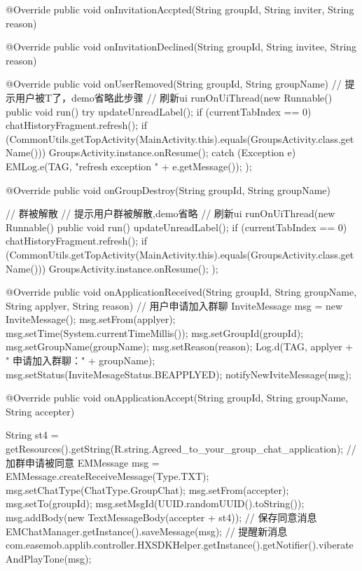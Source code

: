 {{{		}

		@Override
		public void onInvitationAccpted(String groupId, String inviter, String reason) {

		}

		@Override
		public void onInvitationDeclined(String groupId, String invitee, String reason) {

		}

		@Override
		public void onUserRemoved(String groupId, String groupName) {
			// 提示用户被T了，demo省略此步骤
			// 刷新ui
			runOnUiThread(new Runnable() {
				public void run() {
					try {
						updateUnreadLabel();
						if (currentTabIndex == 0)
							chatHistoryFragment.refresh();
						if (CommonUtils.getTopActivity(MainActivity.this).equals(GroupsActivity.class.getName())) {
							GroupsActivity.instance.onResume();
						}
					} catch (Exception e) {
						EMLog.e(TAG, "refresh exception " + e.getMessage());
					}
				}
			});
		}

		@Override
		public void onGroupDestroy(String groupId, String groupName) {
			// 群被解散
			// 提示用户群被解散,demo省略
			// 刷新ui
			runOnUiThread(new Runnable() {
				public void run() {
					updateUnreadLabel();
					if (currentTabIndex == 0)
						chatHistoryFragment.refresh();
					if (CommonUtils.getTopActivity(MainActivity.this).equals(GroupsActivity.class.getName())) {
						GroupsActivity.instance.onResume();
					}
				}
			});

		}

		@Override
		public void onApplicationReceived(String groupId, String groupName, String applyer, String reason) {
			// 用户申请加入群聊
			InviteMessage msg = new InviteMessage();
			msg.setFrom(applyer);
			msg.setTime(System.currentTimeMillis());
			msg.setGroupId(groupId);
			msg.setGroupName(groupName);
			msg.setReason(reason);
			Log.d(TAG, applyer + " 申请加入群聊：" + groupName);
			msg.setStatus(InviteMesageStatus.BEAPPLYED);
			notifyNewIviteMessage(msg);
		}

		@Override
		public void onApplicationAccept(String groupId, String groupName, String accepter) {
			String st4 = getResources().getString(R.string.Agreed_to_your_group_chat_application);
			// 加群申请被同意
			EMMessage msg = EMMessage.createReceiveMessage(Type.TXT);
			msg.setChatType(ChatType.GroupChat);
			msg.setFrom(accepter);
			msg.setTo(groupId);
			msg.setMsgId(UUID.randomUUID().toString());
			msg.addBody(new TextMessageBody(accepter + st4));
			// 保存同意消息
			EMChatManager.getInstance().saveMessage(msg);
			// 提醒新消息
			com.easemob.applib.controller.HXSDKHelper.getInstance().getNotifier().viberateAndPlayTone(msg);

}}}
